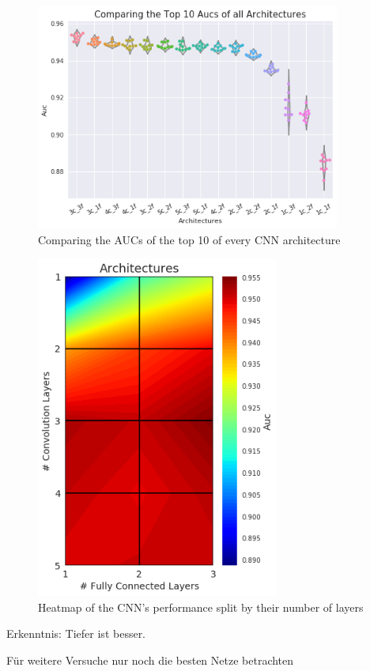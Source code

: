 \begin{figure}
    \centering
    \includegraphics[width=10cm]{Plots/CNN_Architekturen_JMB.png}
    \caption{Comparing the AUCs of the top 10 of every CNN architecture}
    \label{fig:cnn_architectures}
\end{figure}

\begin{figure}
    \centering
    \includegraphics[width=8cm]{Plots/Hyperraum.png}
    \caption{Heatmap of the CNN's performance split by their number of layers}
    \label{fig:heatmap_featurespace}
\end{figure}

Erkenntnis: Tiefer ist besser.

Für weitere Versuche nur noch die besten Netze betrachten



